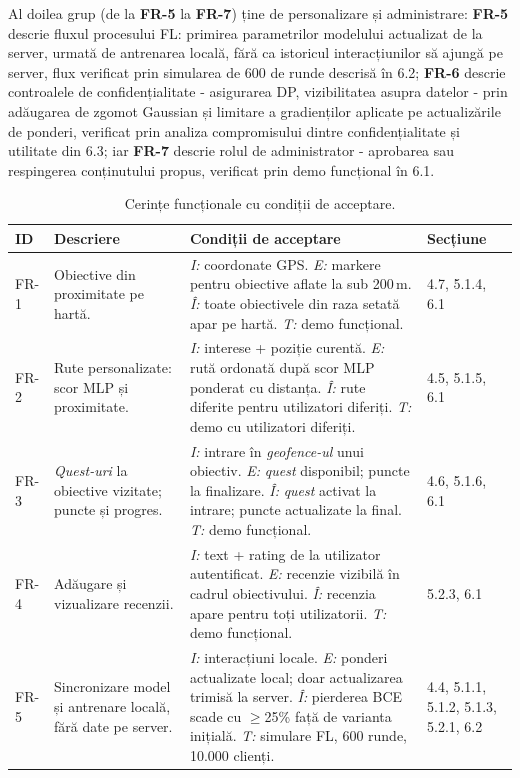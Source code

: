 \documentclass[12pt,a4paper]{report}
\begin{document}
Al doilea grup (de la \textbf{FR-5} la \textbf{FR-7}) ține de personalizare și administrare: \textbf{FR-5} descrie fluxul procesului FL: primirea parametrilor modelului actualizat de la server, urmată de antrenarea locală, fără ca istoricul interacțiunilor să ajungă pe server, flux verificat prin simularea de 600 de runde descrisă în 6.2; \textbf{FR-6} descrie controalele de confidențialitate - asigurarea DP, vizibilitatea asupra datelor - prin adăugarea de zgomot Gaussian și limitare a gradienților aplicate pe actualizările de ponderi, verificat prin analiza compromisului dintre confidențialitate și utilitate din 6.3; iar \textbf{FR-7} descrie rolul de administrator - aprobarea sau respingerea conținutului propus, verificat prin demo funcțional în 6.1.

\begin{table}[h]
\centering
\scriptsize
\caption{Cerințe funcționale cu condiții de acceptare.}
\label{tab:cerinte-functionale}
\begin{tabular}{|l|p{2.8cm}|p{8cm}|p{1.8cm}|}
\hline
\textbf{ID} & \textbf{Descriere} & \textbf{Condiții de acceptare} & \textbf{Secțiune} \\
\hline
FR-1 & Obiective din proximitate pe hartă. &
\textit{I:} coordonate GPS. \textit{E:} markere pentru obiective aflate la sub 200\,m. \textit{Î:} toate obiectivele din raza setată apar pe hartă. \textit{T:} demo funcțional. & 4.7, 5.1.4, 6.1 \\
\hline
FR-2 & Rute personalizate: scor MLP și proximitate. &
\textit{I:} interese + poziție curentă. \textit{E:} rută ordonată după scor MLP ponderat cu distanța. \textit{Î:} rute diferite pentru utilizatori diferiți. \textit{T:} demo cu utilizatori diferiți. & 4.5, 5.1.5, 6.1 \\
\hline
FR-3 & \textit{Quest-uri} la obiective vizitate; puncte și progres. &
\textit{I:} intrare în \textit{geofence-ul} unui obiectiv. \textit{E:} \textit{quest} disponibil; puncte la finalizare. \textit{Î:} \textit{quest} activat la intrare; puncte actualizate la final. \textit{T:} demo funcțional. & 4.6, 5.1.6, 6.1 \\
\hline
FR-4 & Adăugare și vizualizare recenzii. &
\textit{I:} text + rating de la utilizator autentificat. \textit{E:} recenzie vizibilă în cadrul obiectivului. \textit{Î:} recenzia apare pentru toți utilizatorii. \textit{T:} demo funcțional. & 5.2.3, 6.1 \\
\hline
FR-5 & Sincronizare model și antrenare locală, fără date pe server. &
\textit{I:} interacțiuni locale. \textit{E:} ponderi actualizate local; doar actualizarea trimisă la server. \textit{Î:} pierderea BCE scade cu $\geq$25\% față de varianta inițială. \textit{T:} simulare FL, 600 runde, 10.000 clienți. & 4.4, 5.1.1, 5.1.2, 5.1.3, 5.2.1, 6.2 \\

\end{tabular}
\end{table}
\end{document}
